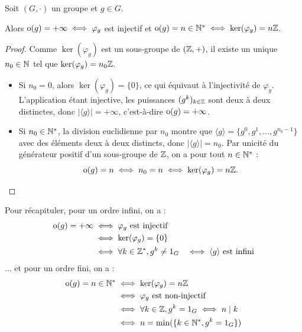 \documentclass[11pt,a4paper]{report}
\begin{document}
\begin{theorem}
    Soit $(G,\cdot)$ un groupe et $g \in G$.
    
    Alors $\mathrm{o}(g) = +\infty \iff \varphi_g$ est injectif et $\mathrm{o}(g) = n \in \mathbb{N}^* \iff \ker(\varphi_g) = n \mathbb{Z}$.
\end{theorem}

\begin{proof}
    Comme $\ker(\varphi_g)$ est un sous-groupe de $(\mathbb{Z},+)$, il existe un unique $n_0 \in \mathbb{N}$ tel que $\ker(\varphi_g) = n_0 \mathbb{Z}$.

    \begin{itemize}
        \item Si $n_0 = 0$, alors $\ker(\varphi_g) = \{0\}$, ce qui équivaut à l'injectivité de $\varphi_g$. L'application étant injective, les puissances $(g^k)_{k \in \mathbb{Z}}$ sont deux à deux distinctes, donc $|\langle g \rangle| = +\infty$, c'est-à-dire $\mathrm{o}(g) = +\infty$.
        
        \item Si $n_0 \in \mathbb{N}^*$, la division euclidienne par $n_0$ montre que $\langle g \rangle = \{g^0, g^1, \dots, g^{n_0-1}\}$ avec des éléments deux à deux distincts, donc $|\langle g \rangle| = n_0$. Par unicité du générateur positif d'un sous-groupe de $\mathbb{Z}$, on a pour tout $n \in \mathbb{N}^*$ :
        \[
        \mathrm{o}(g) = n \iff n_0 = n \iff \ker(\varphi_g) = n\mathbb{Z}.
        \]
    \end{itemize}
\end{proof}


Pour récapituler, pour un ordre infini, on a :
\begin{align*}
    \mathrm{o}(g) = +\infty &\iff \varphi_g \text{ est injectif} \\
    &\iff \ker(\varphi_g) = \{ 0 \} \\
    &\iff \forall k \in \mathbb{Z}^*, g^k \neq 1_G
    &\iff \langle g \rangle \text{ est infini} \\
\end{align*}
... et pour un ordre fini, on a :
\begin{align*}
    \mathrm{o}(g) = n \in \mathbb{N}^* &\iff \ker(\varphi_g) = n \mathbb{Z} \\
    &\iff \varphi_g \text{ est non-injectif} \\
    &\iff \forall k \in \mathbb{Z}, g^k = 1_G \iff n \mid k \\
    &\iff n = \min(\{ k \in \mathbb{N}^*, g^k = 1_G \}) \\
\end{align*}
\end{document}
